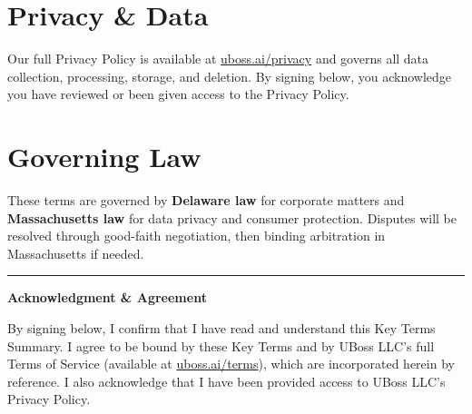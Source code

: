 \documentclass[11pt,letterpaper]{scrartcl}
\begin{document}
\section{Privacy \& Data}

Our full Privacy Policy is available at \href{https://uboss.ai/privacy}{uboss.ai/privacy} and governs all data collection, processing, storage, and deletion. By signing below, you acknowledge you have reviewed or been given access to the Privacy Policy.

\section{Governing Law}

These terms are governed by \textbf{Delaware law} for corporate matters and \textbf{Massachusetts law} for data privacy and consumer protection. Disputes will be resolved through good-faith negotiation, then binding arbitration in Massachusetts if needed.

\vspace{1em}
\textcolor{ruleline}{\rule{\textwidth}{0.4pt}}
\vspace{1em}

\begin{center}
    {\large\bfseries\color{charcoal}Acknowledgment \& Agreement}
\end{center}

\vspace{0.5em}

\begin{tcolorbox}[keyterm, title={}]
By signing below, I confirm that I have read and understand this Key Terms Summary. I agree to be bound by these Key Terms and by UBoss LLC's full Terms of Service (available at \href{https://uboss.ai/terms}{uboss.ai/terms}), which are incorporated herein by reference. I also acknowledge that I have been provided access to UBoss LLC's Privacy Policy.
\end{tcolorbox}

\vspace{1.5em}
\end{document}
